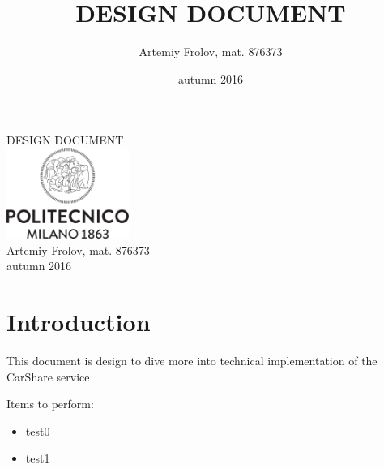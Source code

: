 \documentclass[12pt, letterpaper]{report}
\title{DESIGN DOCUMENT}
\author{Artemiy Frolov, mat. 876373}
\date{autumn 2016}
\begin{document}
\begin{titlepage}
\centering
{\Huge DESIGN DOCUMENT} \\
\vspace{1cm}
\includegraphics[width=4cm]{Logo_Politecnico_Milano.png} \\
\vspace{1cm}
Artemiy Frolov, mat. 876373 \\
\vspace{0.5cm}
autumn 2016
\end{titlepage}



\section{Introduction} %
\label{sec:introduction}


This document is design to dive more into technical implementation of the CarShare service

Items to perform:
\begin{itemize}
	\item test0
	\item test1
\end{itemize}
\end{document}
